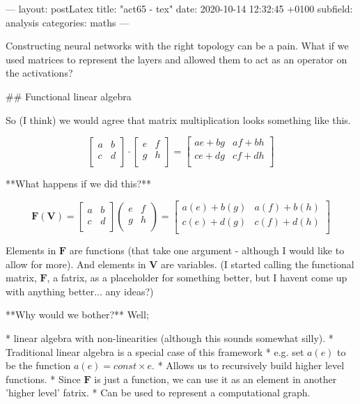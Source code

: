 ---
layout: postLatex
title:  "act65 - tex"
date:   2020-10-14 12:32:45 +0100
subfield: analysis
categories: maths
---

Constructing neural networks with the right topology can be a pain. What if we used matrices to represent the layers and allowed them to act as an operator on the activations?

## Functional linear algebra

So (I think) we would agree that matrix multiplication looks something like this.

$$
\begin{bmatrix}
a & b\\
c & d\\
\end{bmatrix}
\cdot
\begin{bmatrix}
e & f\\
g & h\\
\end{bmatrix}
=
\begin{bmatrix}
ae+bg & af+bh\\
ce+dg & cf+dh\\
\end{bmatrix}
$$


**What happens if we did this?**


$$
\textbf{F}(\textbf{V}) =
\begin{bmatrix}
a & b\\
c & d\\
\end{bmatrix}
\begin{pmatrix}
e & f\\
g & h\\
\end{pmatrix}=
\begin{bmatrix}
a(e)+b(g) & a(f)+b(h)\\
c(e)+d(g) & c(f)+d(h)\\
\end{bmatrix}
$$

Elements in $\textbf{F}$ are functions (that take one argument - although I would like to allow for more). And elements in $\textbf{V}$ are variables. (I started calling the functional matrix, $\textbf{F}$, a fatrix, as a placeholder for something better, but I havent come up with anything better... any ideas?)

**Why would we bother?** Well;

* linear algebra with non-linearities (although this sounds somewhat silly).
* Traditional linear algebra is a special case of this framework
    * e.g. set $a(e)$ to be the function $a(e) = const\times e$.
* Allows us to recursively build higher level functions.
    * Since $\textbf{F}$ is just a function, we can use it as an element in another 'higher level' fatrix.
* Can be used to represent a computational graph.

